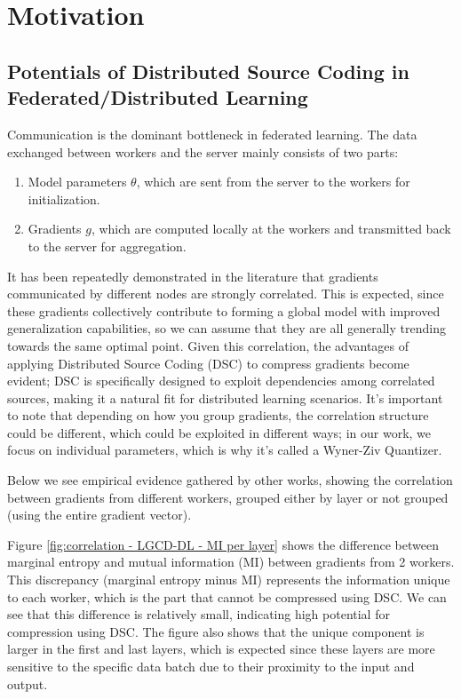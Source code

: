 \section{Motivation}

\subsection{Potentials of Distributed Source Coding in Federated/Distributed Learning}

Communication is the dominant bottleneck in federated learning. The data exchanged between workers and the server mainly consists of two parts:
\begin{enumerate}[nosep]
    \item Model parameters $\theta$, which are sent from the server to the workers for initialization.
    \item Gradients $g$, which are computed locally at the workers and transmitted back to the server for aggregation.
\end{enumerate}

It has been repeatedly demonstrated in the literature that gradients communicated by different nodes are strongly correlated.
This is expected, since these gradients collectively contribute to forming a global model with improved generalization capabilities, so we can assume that they are all generally trending towards the same optimal point.
Given this correlation, the advantages of applying Distributed Source Coding (DSC) to compress gradients become evident; DSC is specifically designed to exploit dependencies among correlated sources, making it a natural fit for distributed learning scenarios.
It's important to note that depending on how you group gradients, the correlation structure could be different, which could be exploited in different ways; in our work, we focus on individual parameters, which is why it's called a Wyner-Ziv Quantizer.

Below we see empirical evidence gathered by other works, showing the correlation between gradients from different workers, grouped either by layer or not grouped (using the entire gradient vector).

Figure \ref{fig:correlation - LGCD-DL - MI per layer} shows the difference between marginal entropy and mutual information (MI) between gradients from 2 workers. This discrepancy (marginal entropy minus MI) represents the information unique to each worker, which is the part that cannot be compressed using DSC. We can see that this difference is relatively small, indicating high potential for compression using DSC. The figure also shows that the unique component is larger in the first and last layers, which is expected since these layers are more sensitive to the specific data batch due to their proximity to the input and output.

